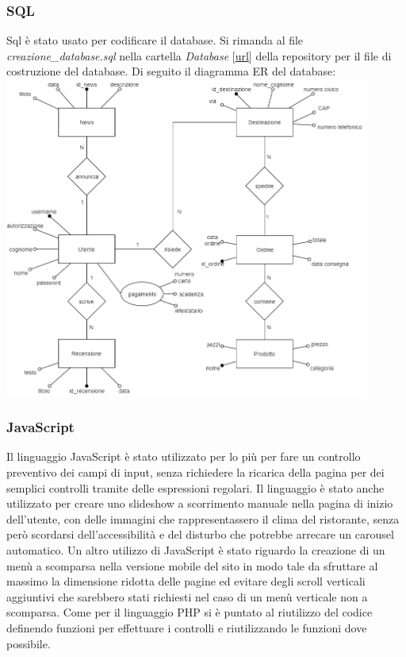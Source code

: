 \documentclass{article}
\begin{document}
			\subsubsection{SQL}
			Sql è stato usato per codificare il database. Si rimanda al file \textit{creazione\_database.sql} nella cartella \textit{Database} [\href{https://github.com/Mirco469/ProgettoSushi/tree/master/Database}{url}] della repository per il file di costruzione del database. Di seguito il diagramma ER del database:\newline
			\includegraphics[width=12cm]{DiagrammaER.png}
			\subsubsection{JavaScript}
			Il linguaggio JavaScript è stato utilizzato per lo più per fare un controllo preventivo dei campi di input, senza richiedere la ricarica della pagina per dei semplici controlli tramite delle espressioni regolari. Il linguaggio è stato anche utilizzato per creare uno slideshow a scorrimento manuale nella pagina di inizio dell'utente, con delle immagini che rappresentassero il clima del ristorante, senza però scordarsi dell'accessibilità e del disturbo che potrebbe arrecare un carousel automatico. Un altro utilizzo di JavaScript è stato riguardo la creazione di un menù a scomparsa nella versione mobile del sito in modo tale da sfruttare al massimo la dimensione ridotta delle pagine ed evitare degli scroll verticali aggiuntivi che sarebbero stati richiesti nel caso di un menù verticale non a scomparsa. Come per il linguaggio PHP si è puntato al riutilizzo del codice definendo funzioni per effettuare i controlli e riutilizzando le funzioni dove possibile.
\end{document}
